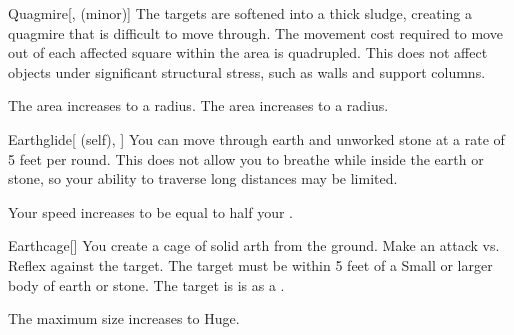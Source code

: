 \lowercase{\hypertarget{spell:Quagmire}{}}\label{spell:Quagmire}
\begin{freeability}[Rank 4]{\hypertarget{spell:Quagmire}{Quagmire}}[,  (minor)]
The targets are softened into a thick sludge, creating a quagmire that is difficult to move through.
The movement cost required to move out of each affected square within the area is quadrupled.
This does not affect objects under significant structural stress, such as walls and support columns.

\rankline
{} The area increases to a \arealarge radius.
 The area increases to a \areahuge radius.
\end{freeability}
\vspace{0.25em}



\lowercase{\hypertarget{spell:Earthglide}{}}\label{spell:Earthglide}
\begin{attuneability}[Rank 5]{\hypertarget{spell:Earthglide}{Earthglide}}[ (self), ]
You can move through earth and unworked stone at a rate of 5 feet per round.
This does not allow you to breathe while inside the earth or stone, so your ability to traverse long distances may be limited.

\rankline
{} Your speed increases to be equal to half your .
\end{attuneability}
\vspace{0.25em}



\lowercase{\hypertarget{spell:Earthcage}{}}\label{spell:Earthcage}
\begin{freeability}[Rank 6]{\hypertarget{spell:Earthcage}{Earthcage}}[]
You create a cage of solid arth from the ground.
Make an attack vs. Reflex against the target.
The target must be within 5 feet of a Small or larger body of earth or stone.
\hit The target is is  as a .

\rankline
{} The maximum size increases to Huge.
\end{freeability}
\vspace{0.25em}



